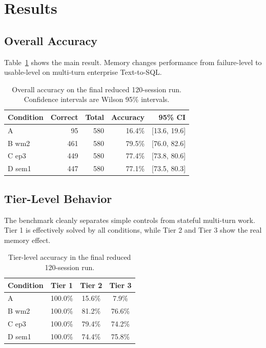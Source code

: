 \documentclass[11pt]{article}
\begin{document}
\section{Results}
\subsection{Overall Accuracy}
Table~\ref{tab:overall} shows the main result. Memory changes performance from failure-level to usable-level on multi-turn enterprise Text-to-SQL.

\begin{table}[ht]
\centering
\begin{tabular}{lrrrr}
\toprule
Condition & Correct & Total & Accuracy & 95\% CI \\
\midrule
A & 95 & 580 & 16.4\% & [13.6, 19.6] \\
B wm2 & 461 & 580 & 79.5\% & [76.0, 82.6] \\
C ep3 & 449 & 580 & 77.4\% & [73.8, 80.6] \\
D sem1 & 447 & 580 & 77.1\% & [73.5, 80.3] \\
\bottomrule
\end{tabular}
\caption{Overall accuracy on the final reduced 120-session run. Confidence intervals are Wilson 95\% intervals.}
\label{tab:overall}
\end{table}

\subsection{Tier-Level Behavior}
The benchmark cleanly separates simple controls from stateful multi-turn work. Tier 1 is effectively solved by all conditions, while Tier 2 and Tier 3 show the real memory effect.

\begin{table}[ht]
\centering
\begin{tabular}{lccc}
\toprule
Condition & Tier 1 & Tier 2 & Tier 3 \\
\midrule
A & 100.0\% & 15.6\% & 7.9\% \\
B wm2 & 100.0\% & 81.2\% & 76.6\% \\
C ep3 & 100.0\% & 79.4\% & 74.2\% \\
D sem1 & 100.0\% & 74.4\% & 75.8\% \\
\bottomrule
\end{tabular}
\caption{Tier-level accuracy in the final reduced 120-session run.}
\label{tab:tier}
\end{table}
\end{document}
